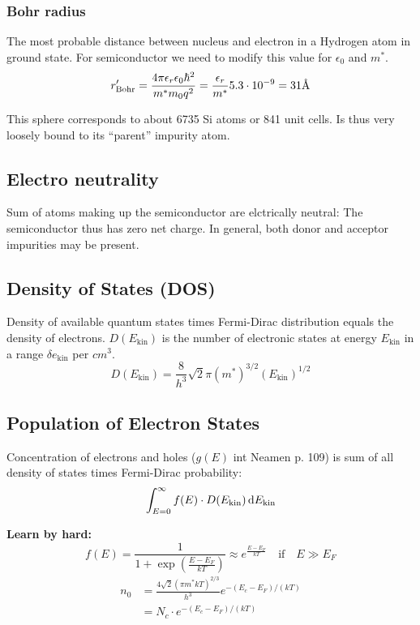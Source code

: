 \documentclass[a4paper, fontsize=8pt, landscape, DIV=1]{scrartcl}
\begin{document}
\begin{multicols*}{4}
  \subsubsection{Bohr radius}
  The most probable distance between nucleus and electron in a Hydrogen atom in ground state. For semiconductor we need to modify this value for $\epsilon_0$ and $m^*$.
  \[r'_{\text{Bohr}}=\frac{4\pi\epsilon_r\epsilon_0\hbar^2}{m^*m_0q^2} = \frac{\epsilon_r}{m^*}5.3\cdot10^{-9}=31\textup{\AA}\]

  This sphere corresponds to about 6735  Si atoms or 841 unit cells. Is thus very loosely bound to its ``parent'' impurity atom.

  \subsection{Electro neutrality}
  Sum of atoms making up the semiconductor are elctrically neutral: The semiconductor thus has zero net charge.
  In general, both donor and acceptor impurities may be present.


  \subsection{Density of States (DOS)}
  Density of available quantum states times Fermi-Dirac distribution equals the density of electrons. $D(E_\text{kin})$ is the number of electronic states at energy $E_\text{kin}$ in a range $\delta e_\text{kin}$ per $cm^3$.
  \[D(E_\text{kin}) = \frac{8}{h^3}\sqrt{2}\pi(m^*)^{3/2}(E_\text{kin})^{1/2}\]

  \subsection{Population of Electron States}
  Concentration of electrons and holes ($g(E)$ int Neamen p. 109) is sum of all density of states times Fermi-Dirac probability:
  \[\int_{E=0}^\infty f(E) \cdot D(E_\text{kin})\,\mathrm{d} E_\text{kin}\]

  \textbf{Learn by hard:}
  \[f(E) = \frac{1}{1+\exp\left(\frac{E-E_F}{kT}\right)} \approx e^{\frac{E-E_F}{kT}} \quad\text{if} \quad E \gg E_F\]
  \begin{align*}
    n_0 &= \frac{4\sqrt{2}(\pi m^* kT)^{2/3}}{h^3}e^{-(E_c-E_F)/(kT)} \\
        &= N_c \cdot e^{-(E_c-E_F)/(kT)}
  \end{align*}


\end{multicols*}
\end{document}
